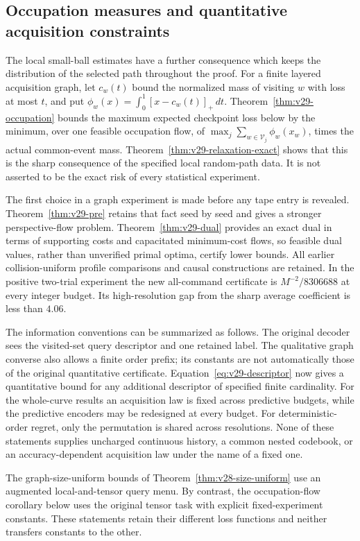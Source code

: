 \subsection{Occupation measures and quantitative acquisition constraints}
The local small-ball estimates have a further consequence which keeps
the distribution of the selected path throughout the proof. For a
finite layered acquisition graph, let $c_w(t)$ bound the normalized
mass of visiting $w$ with loss at most $t$, and put
$\phi_w(x)=\int_0^1[x-c_w(t)]_+\,dt$.
Theorem~\ref{thm:v29-occupation} bounds the maximum expected checkpoint
loss below by the minimum, over one feasible occupation flow, of
$\max_j\sum_{w\in\mathscr V_j}\phi_w(x_w)$, times the actual
common-event mass. Theorem~\ref{thm:v29-relaxation-exact} shows that
this is the sharp consequence of the specified local random-path data.
It is not asserted to be the exact risk of every statistical experiment.

The first choice in a graph experiment is made before any tape entry is
revealed. Theorem~\ref{thm:v29-pre} retains that fact seed by seed and
gives a stronger perspective-flow problem. Theorem~\ref{thm:v29-dual}
provides an exact dual in terms of supporting costs and capacitated
minimum-cost flows, so feasible dual values, rather than unverified
primal optima, certify lower bounds. All earlier collision-uniform
profile comparisons and causal constructions are retained. In the
positive two-trial experiment the new all-command certificate is
$M^{-2}/8306688$ at every integer budget. Its high-resolution gap from
the sharp average coefficient is less than $4.06$.

The information conventions can be summarized as follows. The original
decoder sees the visited-set query descriptor and one retained label.
The qualitative graph converse also allows a finite order prefix; its
constants are not automatically those of the original quantitative
certificate. Equation~\eqref{eq:v29-descriptor} now gives a quantitative
bound for any additional descriptor of specified finite cardinality.
For the whole-curve results an acquisition law is fixed across predictive
budgets, while the predictive encoders may be redesigned at every
budget. For deterministic-order regret, only the permutation is shared
across resolutions. None of these statements supplies uncharged
continuous history, a common nested codebook, or an accuracy-dependent
acquisition law under the name of a fixed one.

The graph-size-uniform bounds of Theorem~\ref{thm:v28-size-uniform}
use an augmented local-and-tensor query menu. By contrast, the
occupation-flow corollary below uses the original tensor task with
explicit fixed-experiment constants. These statements retain their
different loss functions and neither transfers constants to the other.
